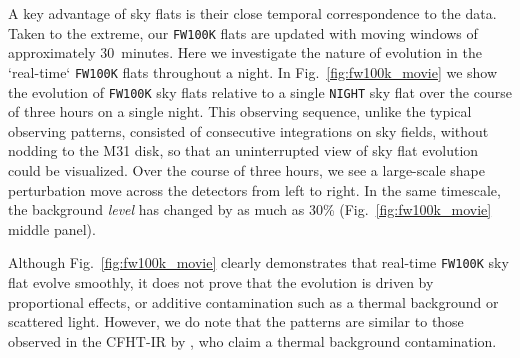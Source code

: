 \documentclass[iop]{emulateapj}
\newcommand{\Fig}[1]{Fig.~\ref{fig:#1}}  %
\newcommand{\Sec}[1]{\S\ref{sec:#1}}  %
\begin{document}

A key advantage of sky flats is their close temporal correspondence to the data.
Taken to the extreme, our \texttt{FW100K} flats are updated with moving windows of approximately 30~minutes.
Here we investigate the nature of evolution in the `real-time` \texttt{FW100K} flats throughout a night.
In \Fig{fw100k_movie} we show the evolution of \texttt{FW100K} sky flats relative to a single \texttt{NIGHT} sky flat over the course of three hours on a single night.
This observing sequence, unlike the typical observing patterns, consisted of consecutive integrations on sky fields, without nodding to the M31 disk, so that an uninterrupted view of sky flat evolution could be visualized.
Over the course of three hours, we see a large-scale shape perturbation move across the detectors from left to right.
In the same timescale, the background \emph{level} has changed by as much as 30\% (\Fig{fw100k_movie} middle panel).

Although \Fig{fw100k_movie} clearly demonstrates that real-time \texttt{FW100K} sky flat evolve smoothly, it does not prove that the evolution is driven by proportional effects, or additive contamination such as a thermal background or scattered light.
However, we do note that the patterns are similar to those observed in the CFHT-IR by \cite{Vaduvescu:2004}, who claim a thermal background contamination.

\end{document}

